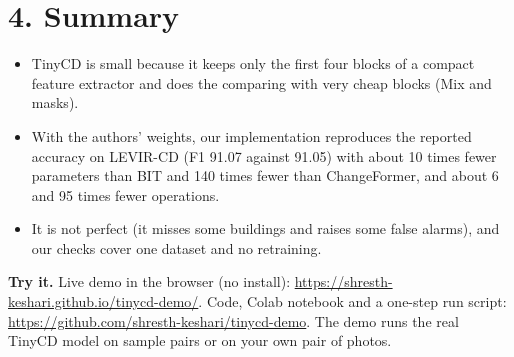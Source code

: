 \documentclass[10pt,a4paper]{article}
\begin{document}
\section*{4. Summary}
\begin{itemize}\item TinyCD is small because it keeps only the first four blocks of a compact feature extractor and does the comparing with very cheap blocks (Mix and masks).
\item With the authors' weights, our implementation reproduces the reported accuracy on LEVIR-CD (F1 91.07 against 91.05) with about 10 times fewer parameters than BIT and 140 times fewer than ChangeFormer, and about 6 and 95 times fewer operations.
\item It is not perfect (it misses some buildings and raises some false alarms), and our checks cover one dataset and no retraining.
\end{itemize}
\textbf{Try it.} Live demo in the browser (no install): \url{https://shresth-keshari.github.io/tinycd-demo/}. Code, Colab notebook and a one-step run script: \url{https://github.com/shresth-keshari/tinycd-demo}. The demo runs the real TinyCD model on sample pairs or on your own pair of photos.
\end{document}
